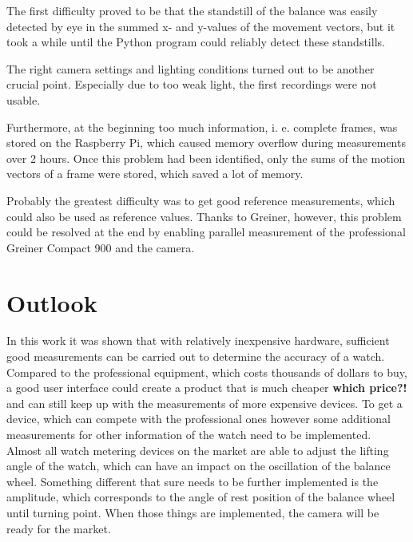 \documentclass[12pt, a4paper]{report}
\begin{document}
The first difficulty proved to be that the standstill of the balance was easily detected by eye in the summed x- and y-values of the movement vectors, but it took a while until the Python program could reliably detect these standstills.

The right camera settings and lighting conditions turned out to be another crucial point. Especially due to too weak light, the first recordings were not usable. 

Furthermore, at the beginning too much information, i. e. complete frames, was stored on the Raspberry Pi, which caused memory overflow during measurements over 2 hours. Once this problem had been identified, only the sums of the motion vectors of a frame were stored, which saved a lot of memory.

Probably the greatest difficulty was to get good reference measurements, which could also be used as reference values. Thanks to Greiner, however, this problem could be resolved at the end by enabling parallel measurement of the professional Greiner Compact 900 and the camera.

    \section{Outlook}
    In this work it was shown that with relatively inexpensive hardware, sufficient good measurements can be carried out to determine the accuracy of a watch. Compared to the professional equipment, which costs thousands of dollars to buy, a good user interface could create a product that is much cheaper \textbf{which price?!} and can still keep up with the measurements of more expensive devices. 
 To get a device, which can compete with the professional ones however some additional measurements for other information of the watch need to be implemented. Almost all watch metering devices on the market are able to adjust the lifting angle of the watch, which can have an impact on the oscillation of the balance wheel. Something different that sure needs to be further implemented is the amplitude, which corresponds to the angle of rest position of the balance wheel until turning point. When those things are implemented, the camera will be ready for the market. 
    
    \glsaddall
    \printglossaries

\printbibliography
        
    \listoffigures
    \bigskip
      
\end{document}
